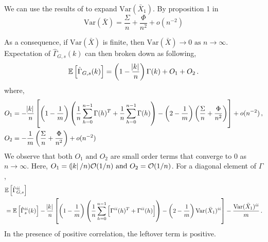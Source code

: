 \documentclass[11pt]{article}
\newcommand{\E}{\mathbb{E}}
\newcommand{\Var}{\text{Var}}
\theoremstyle{remark}
\begin{document}
 We can use the results of \cite{song1995optimal} to expand $\Var(\bar{X}_1)$. By proposition 1 in \cite{song1995optimal} 
\[
\Var(\bar{X}) = \dfrac{\Sigma}{n} + \dfrac{\Phi}{n^2} + o(n^{-2})
\]

As a consequence, if $\Var(\bar{X})$ is finite, then $\Var(\bar{X}) \to 0 \textrm{ as } n \to \infty$. Expectation of $\hat{\Gamma}_{G,s}(k)$ can then broken down as following,
 \begin{equation} \label{eq:G-ACF_expec_breakdown}
     \mathbb{E}\left[\hat{\Gamma}_{G,s}(k)\right] = \left(1- \dfrac{\abs{k}}{n}\right)\Gamma(k) + O_1 + O_2\,.
 \end{equation}
%
where,
\begin{align*}
    O_1 &= -\dfrac{\abs{k}}{n}\left[\left(1-\dfrac{1}{m}\right)\left(\dfrac{1}{n}\sum_{h=0}^{n-1}\Gamma(h)^T + \dfrac{1}{n}\sum_{h=0}^{n-1}\Gamma(h)\right) - \left(2-\dfrac{1}{m}\right) \left(\dfrac{\Sigma}{n} + \dfrac{\Phi}{n^2}\right)\right] + o(n^{-2})\, ,\\
    O_2 &= -\dfrac{1}{m}\left(\dfrac{\Sigma}{n} + \dfrac{\Phi}{n^2}\right) + o(n^{-2})
\end{align*}
%
We observe that both $O_1 \textrm{ and } O_2$ are small order terms that converge to 0 as $n \to \infty$. Here, $O_1 = (\abs{k}/n)\mathcal{O}(1/n) \textrm{ and } O_2 = {\mathcal{O}}(1/n)$. For a diagonal element of $\Gamma$,
%
\begin{align*}
& \E \left[ \hat{\Gamma}_{G,s}^{ii}\right]\\
& = \mathbb{E}\left[\hat{\Gamma}^{ii}_{s}(k)\right] - \dfrac{\abs{k}}{n}\left[\left(1-\dfrac{1}{m}\right)\left(\dfrac{1}{n}\sum_{h=0}^{n-1} \left[\Gamma^{ii}(h)^T + \Gamma^{ii}(h) \right] \right) - \left(2-\dfrac{1}{m}\right) \Var(\bar{X}_1)^{ii}\right] - \dfrac{\Var(\bar{X}_1)^{ii}}{m}\,.
\end{align*}
In the presence of positive correlation, the leftover term is positive.


\end{document}
